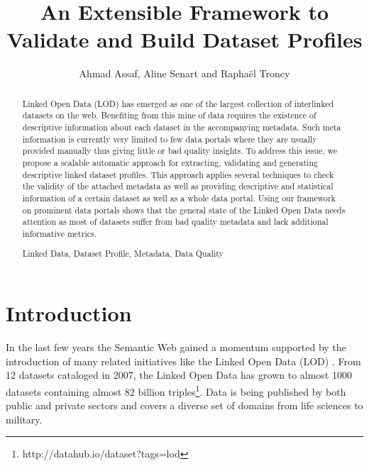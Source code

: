 \documentclass[runningheads,a4paper]{llncs}
\newcommand{\keywords}[1]{\par\addvspace\baselineskip
\noindent\keywordname\enspace\ignorespaces#1}
\begin{document}
\title{An Extensible Framework to Validate and Build Dataset Profiles}

\author{Ahmad Assaf, Aline Senart and Rapha\"{e}l Troncy }



\maketitle


\begin{abstract}
Linked Open Data (LOD) has emerged as one of the largest collection of interlinked datasets on the web. Benefiting from this mine of data requires the existence of descriptive information about each dataset in the accompanying metadata. Such meta information is currently very limited to few data portals where they are usually provided manually thus giving little or bad quality insights. To address this issue, we propose a scalable automatic approach for extracting, validating and generating descriptive linked dataset profiles. This approach applies several techniques to check the validity of the attached metadata as well as providing descriptive and statistical information of a certain dataset as well as a whole data portal. Using our framework on prominent data portals shows that the general state of the Linked Open Data needs attention as most of datasets suffer from bad quality metadata and lack additional informative metrics.
\keywords{Linked Data, Dataset Profile, Metadata, Data Quality}
\end{abstract}


\section{Introduction}
\label{sec:introduction}
In the last few years the Semantic Web gained a momentum supported by the introduction of many related initiatives like the Linked Open Data (LOD) \cite{BizerHeath2009}. From 12 datasets cataloged in 2007, the Linked Open Data has grown to almost 1000 datasets containing almost 82 billion triples\footnote{http://datahub.io/dataset?tags=lod}. Data is being published by both public and private sectors and covers a diverse set of domains from life sciences to military.
\end{document}
